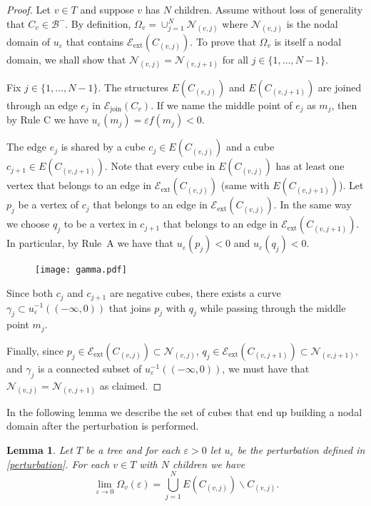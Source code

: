 \documentclass[11pt,reqno]{amsart}
\newcommand{\ep}{\varepsilon}
\newtheorem{lemma}[theorem]{Lemma}
\theoremstyle{definition}
\begin{document}
\begin{proof} 
Let $v \in T$ and suppose $v$ has $N$ children. Assume without loss of generality that $C_v \in \mathcal B^-$. By definition, $\Omega_{v}=\cup_{j=1}^N \mathcal N_{(v,j)}$ where  $\mathcal N_{(v,j)}$  is the nodal domain of $u_\ep$ that contains  $\mathcal E_{\text{ext}} (C_{(v,j)})$. To prove that $\Omega_v$ is itself a nodal domain, we shall show that $\mathcal N_{(v,j)}=\mathcal N_{(v,j+1)}$ for all $j \in \{1, \dots, N-1\}$.

Fix $j \in \{1, \dots, N-1\}$. The structures $E(C_{(v,j)})$ and $E(C_{(v,j+1)})$ are joined through an edge $e_j$ in $\mathcal E_{\text{join}}(C_v)$. If we name the middle point of $e_j$ as $m_j$,  then by Rule C we have  $u_\ep(m_j)=\ep f(m_j)<0$. 

The edge $e_j$ is shared by a cube $c_j \in E(C_{(v,j)})$ and a cube $c_{j+1} \in E(C_{(v,j+1)})$.
Note that every cube in $E(C_{(v,j)})$ has at least one vertex that belongs to an edge in $\mathcal E_{\text{ext}} (C_{(v,j)})$ (same with  $E(C_{(v,j+1)})$). Let  $p_j$ be a vertex of  $c_j$ that belongs to an edge in  $\mathcal E_{\text{ext}} (C_{(v,j)})$. In the same way we choose  $q_{j}$ to be a vertex in $ c_{j+1}$ that belongs to an edge in  $\mathcal E_{\text{ext}} (C_{(v,j+1)})$. In particular, by Rule~A we have that  $u_\ep(p_j)<0$ and $u_\ep(q_j)<0$.

 \begin{figure}[h!]
\texttt{[image: gamma.pdf]}
\caption{}
\label{figure join}
 \end{figure}
Since both $c_j$ and $c_{j+1}$ are negative cubes, there exists a curve $\gamma_j \subset u_\ep^{-1}((-\infty,0))$ that joins $p_j $ with $q_j$  while passing through the middle point $m_j$. 

Finally, since $p_j \in \mathcal E_{\text{ext}} (C_{(v,j)}) \subset  \mathcal N_{(v,j)}$,  $q_j \in \mathcal E_{\text{ext}} (C_{(v,j+1)}) \subset  \mathcal N_{(v,j+1)} $, and $\gamma_j$ is a connected subset of $u_\ep^{-1}((-\infty, 0))$, we must have that $\mathcal N_{(v,j)}=\mathcal N_{(v,j+1)}$ as claimed.

\end{proof}
 
In the following lemma we describe the set of cubes that end up building a nodal domain after the perturbation is performed.

\begin{lemma}\label{limit}
Let $T$ be a tree and for each  $\ep>0$ let $u_\ep$ be the perturbation defined in \eqref{perturbation}.  For each  $v \in T$ with $N$ children we have 
\[\lim_{\ep \to 0} \Omega_v(\ep)=  \bigcup_{j=1}^N E(C_{(v,j)} ) \backslash C_{(v,j)}.\]
\end{lemma}
\end{document}
